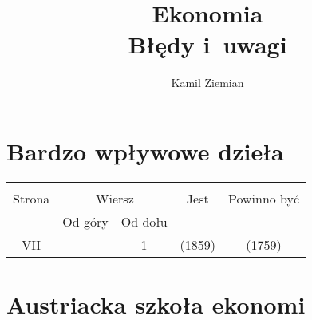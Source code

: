 \documentclass[a4paper,11pt]{article}
\title{Ekonomia \\
  Błędy i~uwagi}
\author{Kamil Ziemian}
\begin{document}





\maketitle %





\section{Bardzo wpływowe dzieła}

\vspace{\spaceTwo}







\begin{center}

  \begin{tabular}{|c|c|c|c|c|}
    \hline
    & \multicolumn{2}{c|}{} & & \\
    Strona & \multicolumn{2}{c|}{Wiersz} & Jest
                              & Powinno być \\ \cline{2-3}
    & Od góry & Od dołu & & \\
    \hline
    VII & & 1 & (1859) & (1759) \\
    \hline
  \end{tabular}

\end{center}


\vspace{\spaceOne}











\section{Austriacka szkoła ekonomi}
\end{document}
